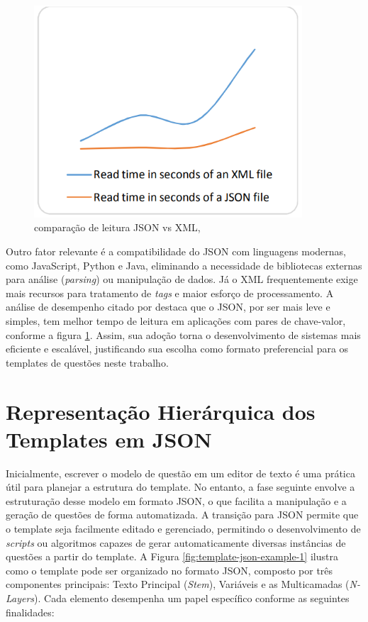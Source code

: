 \begin{figure}[ht]
	\centering
	\includegraphics[width=10cm]{./imagens/capitulo5/json-vs-xml}
	\caption{comparação de leitura JSON vs XML, \parencite{goyal2017} }
	\label{fig:json-vs-xml}
\end{figure}

Outro fator relevante é a compatibilidade do JSON com linguagens modernas, como JavaScript, Python e Java, eliminando a necessidade de bibliotecas externas para análise (\textit{parsing}) ou manipulação de dados. Já o XML frequentemente exige mais recursos para tratamento de \textit{tags} e maior esforço de processamento. A análise de desempenho citado por \parencite{goyal2017} destaca que o JSON, por ser mais leve e simples, tem melhor tempo de leitura em aplicações com pares de chave-valor, conforme a figura \ref{fig:json-vs-xml}. Assim, sua adoção torna o desenvolvimento de sistemas mais eficiente e escalável, justificando sua escolha como formato preferencial para os templates de questões neste trabalho.


\section{Representação Hierárquica dos Templates em JSON}

Inicialmente, escrever o modelo de questão em um editor de texto é uma prática útil para planejar a estrutura do template. No entanto, a fase seguinte envolve a estruturação desse modelo em formato JSON, o que facilita a manipulação e a geração de questões de forma automatizada. A transição para JSON permite que o template seja facilmente editado e gerenciado, permitindo o desenvolvimento de \textit{scripts} ou algoritmos capazes de gerar automaticamente diversas instâncias de questões a partir do template.
A Figura \ref{fig:template-json-example-1} ilustra como o template pode ser organizado no formato JSON, composto por três componentes principais: Texto Principal (\textit{Stem}), Variáveis e as Multicamadas (\textit{N-Layers}). Cada elemento desempenha um papel específico conforme as seguintes finalidades:


